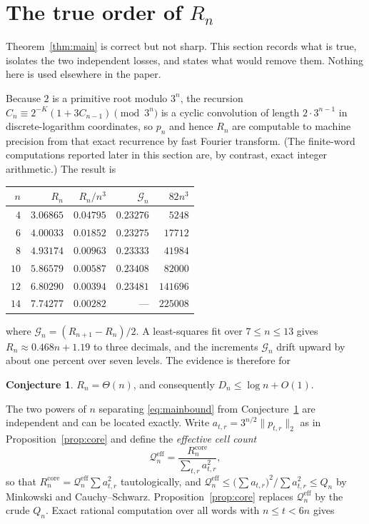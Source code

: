 \documentclass[11pt,reqno]{amsart}
\theoremstyle{plain}
\theoremstyle{definition}
\newtheorem{conjecture}[theorem]{Conjecture}
\theoremstyle{remark}
\begin{document}
\section{The true order of \texorpdfstring{$R_n$}{Rn}}\label{sec:trueorder}

Theorem~\ref{thm:main} is correct but not sharp. This section records what
is true, isolates the two independent losses, and states what would remove
them. Nothing here is used elsewhere in the paper.

Because $2$ is a primitive root modulo $3^n$, the recursion
$C_n\equiv2^{-K}(1+3C_{n-1})\pmod{3^n}$ is a cyclic convolution of length
$2\cdot3^{n-1}$ in discrete-logarithm coordinates, so $p_n$ and hence $R_n$
are computable to machine precision from that exact recurrence by fast
Fourier transform. (The finite-word computations reported later in this
section are, by contrast, exact integer arithmetic.) The result is

\begin{center}
\begin{tabular}{@{}rrrrr@{}}
\toprule
$n$ & $R_n$ & $R_n/n^3$ & $\mathcal G_n$ & $82n^3$\\
\midrule
$4$  & $3.06865$ & $0.04795$ & $0.23276$ & $5248$\\
$6$  & $4.00033$ & $0.01852$ & $0.23275$ & $17712$\\
$8$  & $4.93174$ & $0.00963$ & $0.23333$ & $41984$\\
$10$ & $5.86579$ & $0.00587$ & $0.23408$ & $82000$\\
$12$ & $6.80290$ & $0.00394$ & $0.23481$ & $141696$\\
$14$ & $7.74277$ & $0.00282$ & --- & $225008$\\
\bottomrule
\end{tabular}
\end{center}

\noindent
where $\mathcal G_n=(R_{n+1}-R_n)/2$. A least-squares fit over
$7\le n\le13$ gives $R_n\approx0.468n+1.19$ to three decimals, and the
increments $\mathcal G_n$ drift upward by about one percent over seven
levels. The evidence is therefore for

\begin{conjecture}\label{conj:linear}
$R_n=\Theta(n)$, and consequently $D_n\le\log n+O(1)$.
\end{conjecture}

The two powers of $n$ separating \eqref{eq:mainbound} from
Conjecture~\ref{conj:linear} are independent and can be located exactly.
Write $a_{t,r}=3^{n/2}\|p_{t,r}\|_2$ as in Proposition~\ref{prop:core} and
define the \emph{effective cell count}
\[
\mathcal Q_n^{\mathrm{eff}}
=\frac{R_n^{\mathrm{core}}}{\sum_{t,r}a_{t,r}^2},
\]
so that $R_n^{\mathrm{core}}=\mathcal Q_n^{\mathrm{eff}}\sum a_{t,r}^2$
tautologically, and
$\mathcal Q_n^{\mathrm{eff}}\le\bigl(\sum a_{t,r}\bigr)^2/\sum a_{t,r}^2
\le Q_n$ by Minkowski and Cauchy--Schwarz. Proposition~\ref{prop:core}
replaces $\mathcal Q_n^{\mathrm{eff}}$ by the crude $Q_n$. Exact rational computation over all words with $n\le t<6n$
gives
\end{document}
